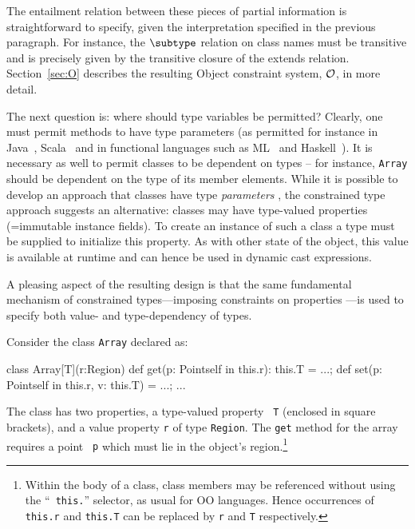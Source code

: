 The entailment relation between these pieces of partial information is
straightforward to specify, given the interpretation specified in the
previous paragraph. For instance, the $\subtype$ relation on class
names must be transitive and is precisely given by the transitive
closure of the extends relation.
Section~\ref{sec:O} describes the
resulting Object constraint system, $\cal O$, in more detail.

The next question is: where should type variables be permitted?
Clearly, one must permit methods to have type parameters (as permitted
for instance in Java~\cite{Java3}, Scala~\cite{scala} and in
functional languages such as ML~\cite{ml} and Haskell~\cite{haskell}).
It is necessary as well to permit classes to be dependent on types --
for instance, {\tt Array} should be dependent on the type of its
member elements. While it is possible to develop an approach that
classes have type {\em parameters} \cite{Java3}, the constrained
type approach suggests an alternative: classes may have type-valued
properties (=immutable instance fields). To create an instance of such
a class a type must be supplied to initialize this property. As with
other state of the object, this value is available at runtime and
can hence be used in dynamic cast expressions.

A pleasing aspect of the resulting design is that the same fundamental
mechanism of constrained types---imposing constraints on properties
---is used to specify both value- and type-dependency of types.

\begin{example}[Array]
  Consider the class {\tt Array} declared as:
{\footnotesize
\begin{xten}
class Array[T](r:Region) {
  def get(p: Point{self in this.r}): this.T = ...;
  def set(p: Point{self in this.r}, v: this.T) = ...;
  ...
}
\end{xten}}
{}\noindent The class has two properties, a type-valued property {\tt
T} (enclosed in square brackets), and a value property {\tt r} of type
{\tt Region}. The {\tt get} method for the array requires a point {\tt
p} which must lie in the object's region.\footnote{Within the body of
a class, class members may be referenced without using the ``{\tt
this.}'' selector, as usual for OO languages. Hence occurrences of
{\tt this.r} and {\tt this.T} can be replaced by {\tt r} and {\tt T}
respectively.}
\end{example}

